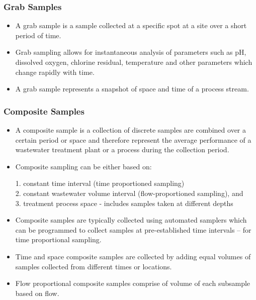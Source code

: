 \subsubsection{Grab Samples}
				\begin{itemize}
					\item A grab sample is a sample collected at a specific spot at a site over a short period of time.  
					\item Grab sampling allows for instantaneous analysis of parameters such as pH, dissolved oxygen, chlorine residual, temperature and other parameters which change rapidly with time.
					\item A grab sample represents a snapshot of space and time of a process stream.
					\end{itemize}
\subsubsection{Composite Samples}
				\begin{itemize}
					\item A composite sample is a collection of discrete samples are combined over a certain period or space and therefore represent the average performance of a wastewater treatment plant or a process during the collection period.\\  
					\item Composite sampling can be either based on:
					      
					      1. constant time interval (time proportioned sampling)\\
					      2. constant wastewater volume interval (flow-proportioned sampling), and\\
					      3. treatment process space - includes samples taken at different depths\\
					      
					\item Composite samples are typically collected using automated samplers which can be programmed to collect samples at pre-established time intervals – for time proportional sampling.
					\item Time and space composite samples are collected by adding equal volumes of samples collected from different times or locations.  
					\item Flow proportional composite samples comprise of volume of each subsample based on flow.\\  
				\end{itemize}
				

